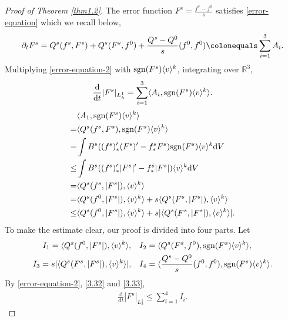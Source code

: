 \documentclass[reqno,10pt]{amsart}
\let\pa=\partial
\def\pa{\partial}
\newcommand{\beq}{\begin{equation}}
\newcommand{\eeq}{\end{equation}}
\newcommand{\ben}{\begin{eqnarray}}
\newcommand{\een}{\end{eqnarray}}
\theoremstyle{definition}
\numberwithin{equation}{section}
\begin{document}
\begin{proof}[Proof of Theorem \ref{thm1.2}] The error function $F^s=\frac{f^s-f^0}{s}$ satisfies \eqref{error-equation} which we recall below,
\ben\label{error-equation-2}
	\pa_t F^s=Q^s(f^s,F^s)+Q^s(F^s,f^0)+\frac{Q^s-Q^0}{s}(f^0,f^0) \colonequals \sum\limits_{i=1}^{3} A_i.
	\een
Multiplying \eqref{error-equation-2} with $\textup{sgn}(F^s)\langle v\rangle^k$, integrating over $\mathbb{R}^3$,
$$
\frac{\mathrm{d}}{\mathrm{d}t}|F^s|_{L^1_k}=\sum\limits_{i=1}^{3}\langle A_i,\textup{sgn}(F^s)\langle v\rangle^k\rangle.
$$
\beq\label{3.32}
\begin{aligned}
    &\langle A_1,\textup{sgn}(F^s)\langle v\rangle^k\rangle\\
    =& \langle Q^s(f^s,F^s),\textup{sgn}(F^s)\langle v\rangle^k\rangle\\
    =&\int B^s((f^s)'_*(F^s)'-f^s_*F^s)\textup{sgn}(F^s)\langle v\rangle^k\mathrm{d}V\\
    \le &\int B^s((f^s)'_*|F^s|'-f^s_*|F^s|)\langle v\rangle^k\mathrm{d}V\\
    = &\langle Q^s(f^s,|F^s|),\langle v\rangle^k\rangle\\
    =&\langle Q^s(f^0,|F^s|),\langle v\rangle^k\rangle+s\langle Q^s(F^s,|F^s|),\langle v\rangle^k\rangle\\
    \le& \langle Q^s(f^0,|F^s|),\langle v\rangle^k\rangle+s|\langle Q^s(F^s,|F^s|),\langle v\rangle^k\rangle|.
\end{aligned}
\eeq
To make the estimate clear, our proof is divided into four parts. Let
\beq\label{3.33}
\begin{aligned}
I_1=\langle Q^s(f^0,|F^s|),\langle v\rangle^k\rangle,&\quad I_2=\langle Q^s(F^s,f^0),\textup{sgn}(F^s)\langle v\rangle^k\rangle,\\
I_3=s|\langle Q^s(F^s,|F^s|),\langle v\rangle^k\rangle|,&\quad I_4=\langle \frac{Q^s-Q^0}{s}(f^0,f^0),\textup{sgn}(F^s)\langle v\rangle^k\rangle.
\end{aligned}
\eeq
By \eqref{error-equation-2}, \eqref{3.32} and \eqref{3.33},
\ben\label{3.34}
\frac{\mathrm{d}}{\mathrm{d}t}|F^s|_{L^1_2}\le \sum\limits_{i=1}^{4} I_i.
\een


\end{proof}
\end{document}
